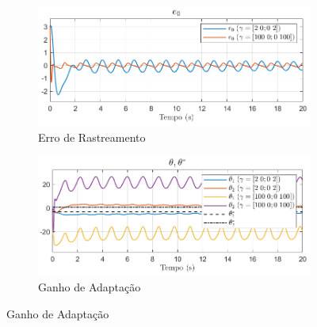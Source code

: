 \documentclass[10pt]{article}
\begin{document}
\begin{figure}[h!]
    \centering
    \begin{subfigure}[b]{0.3\textwidth}
        \centering
        \includegraphics[width=\textwidth]{img/fig04a.png}
        \caption{Erro de Rastreamento}
    \end{subfigure}
    \begin{subfigure}[b]{0.3\textwidth}
        \centering
        \includegraphics[width=\textwidth]{img/fig04b.png}
        \caption{Ganho de Adaptação}
    \end{subfigure}


\end{figure}
\end{document}
